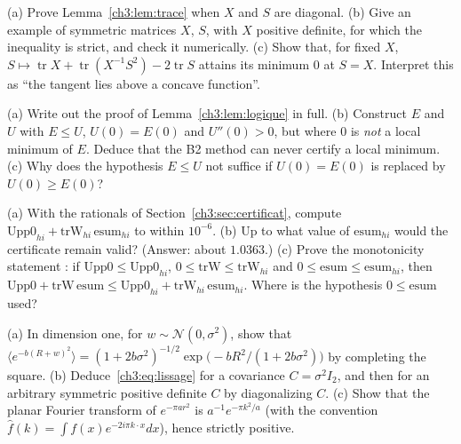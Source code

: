 \begin{exercise}\label{ch3:ex:trace2}
(a) Prove Lemma~\ref{ch3:lem:trace} when $X$ and $S$ are diagonal. (b) Give an example of symmetric matrices $X$, $S$,
with $X$ positive definite, for which the inequality is strict, and check it numerically. (c) Show that, for fixed
$X$, $S\mapsto\operatorname{tr}X+\operatorname{tr}(X^{-1}S^2)-2\operatorname{tr}S$ attains its minimum $0$ at
$S=X$. Interpret this as ``the tangent lies above a concave function''.
\end{exercise}

\begin{exercise}\label{ch3:ex:logique}
(a) Write out the proof of Lemma~\ref{ch3:lem:logique} in full. (b) Construct $E$ and $U$ with $E\le U$, $U(0)=E(0)$
and $U''(0)>0$, but where $0$ is \emph{not} a local minimum of $E$. Deduce that the B2 method can never
certify a local minimum. (c) Why does the hypothesis $E\le U$ not suffice if $U(0)=E(0)$ is replaced by
$U(0)\ge E(0)$?
\end{exercise}

\begin{exercise}\label{ch3:ex:cert}
(a) With the rationals of Section~\ref{ch3:sec:certificat}, compute $\mathrm{Upp0}_{hi}+\mathrm{trW}_{hi}\,\mathrm{esum}_{hi}$
to within $10^{-6}$. (b) Up to what value of $\mathrm{esum}_{hi}$ would the certificate remain valid? (Answer:
about $1.0363$.) (c) Prove the monotonicity statement : if $\mathrm{Upp0}\le\mathrm{Upp0}_{hi}$,
$0\le\mathrm{trW}\le\mathrm{trW}_{hi}$ and $0\le\mathrm{esum}\le\mathrm{esum}_{hi}$, then
$\mathrm{Upp0}+\mathrm{trW}\,\mathrm{esum}\le\mathrm{Upp0}_{hi}+\mathrm{trW}_{hi}\,\mathrm{esum}_{hi}$. Where is the
hypothesis $0\le\mathrm{esum}$ used?
\end{exercise}

\begin{exercise}\label{ch3:ex:gauss}
(a) In dimension one, for $w\sim\mathcal N(0,\sigma^2)$, show that
$\langle e^{-b(R+w)^2}\rangle=(1+2b\sigma^2)^{-1/2}\exp\bigl(-bR^2/(1+2b\sigma^2)\bigr)$ by completing the square.
(b) Deduce~\eqref{ch3:eq:lissage} for a covariance $C=\sigma^2I_2$, and then for an arbitrary symmetric positive
definite $C$ by diagonalizing $C$. (c) Show that the planar Fourier transform of $e^{-\pi ar^2}$ is
$a^{-1}e^{-\pi k^2/a}$ (with the convention $\hat f(k)=\int f(x)e^{-2i\pi k\cdot x}dx$), hence strictly positive.
\end{exercise}


